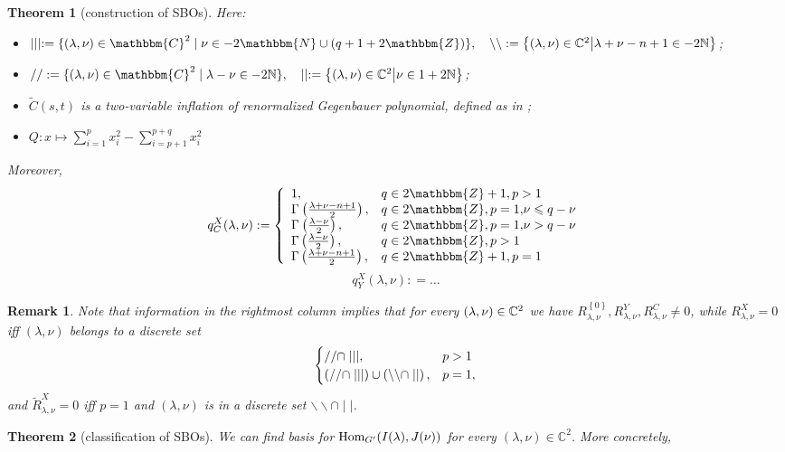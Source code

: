 \documentclass[10pt]{article} %
\newcommand{\assign}{:=}
\newcommand{\comma}{{,}}
\newtheorem{theorem}{Theorem}
\newcommand{\Hom}{\mbox{\normalfont Hom}}
\newtheorem{remark}{Remark}
\theoremstyle{definition}
\begin{document}
\begin{theorem}[construction of SBOs]
Here:
\begin{itemize}
	\item $\mid \mid \mid \assign \{ (\lambda, \nu) \in \mathbbm{C}^2 \mid \nu \in
	- 2\mathbbm{N} \cup (q + 1 + 2\mathbbm{Z}) \},\quad \backslash\backslash:=\mysetn{(\lambda,\nu)\in\C^2}{\lambda+\nu-n+1\in-2\N}$;
\item $/ / \assign
\{ (\lambda, \nu) \in \mathbbm{C}^2 \mid \lambda - \nu \in
-2\N \},\quad \mid\mid:=\mysetn{(\lambda,\nu)\in\C^2}{\nu\in1+2\N}$;
\item $\tilde{C}(s,t)$ is a two-variable inflation of renormalized Gegenbauer polynomial, defined as in \cite{kobayashi2015symmetry};
\item $Q:x\mapsto \sum_{i=1}^px_i^2-\sum_{i=p+1}^{p+q}x_i^2$
\end{itemize}
Moreover,\\
\[ q_C^X (\lambda, \nu) : = \left\{ \begin{array}{ll}
     1, & q \in 2\mathbbm{Z}+ 1, p > 1\\
     \Gamma^{} \left( \frac{\lambda + \nu - n + 1}{2} \right), & q \in
     2\mathbbm{Z}, p = 1 \comma \nu \leqslant q - \nu\\
     \Gamma^{} \left( \frac{\lambda - \nu}{2} \right), & q \in 2\mathbbm{Z}, p
     = 1 \comma \nu > q - \nu\\
     \Gamma \left( \frac{\lambda - \nu}{2} \right), & q \in 2\mathbbm{Z}, p >
     1\\
     \Gamma \left( \frac{\lambda + \nu - n + 1}{2} \right), & q \in
     2\mathbbm{Z}+ 1, p = 1
   \end{array} \right. \]
   \[ q_Y^X (\lambda, \nu) : = \dots\]
\end{theorem}
\begin{remark}
	Note that information in the rightmost column implies that for every $(\lambda,\nu)\in\mathbb{C}^2$ we have $R_{\lambda,\nu}^{ \left\{ 0 \right\}},R_{\lambda,\nu}^Y,R_{\lambda,\nu}^C\neq0$, while
	$R^X_{\lambda,\nu}=0$ iff $(\lambda,\nu)$ belongs to a discrete set
	\[\begin{cases}
			//\cap\mid\mid\mid,&p>1\\
			\left(//\cap\mid\mid\mid\right) \cup \left(\backslash\backslash\cap\mid\mid\right),&p=1,
		\end{cases}
	\]
	and $\tilde{R}_{\lambda,\nu}^X=0$ iff $p=1$ and $(\lambda,\nu)$ is in a discrete set $\backslash\backslash\cap \mid\mid$.
\end{remark}
\begin{theorem}[classification of SBOs]
		We can find basis for $\Hom_{G'}(I(\lambda),J(\nu))$ for every $(\lambda,\nu)\in \mathbb{C}^2$. More concretely,
\end{theorem}
\end{document}
